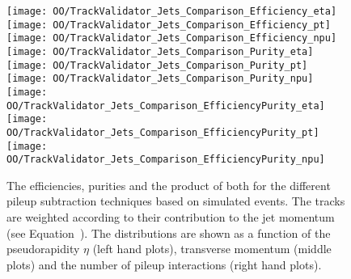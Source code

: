 \begin{figure}[h!t]
  \centering
  \texttt{[image: OO/TrackValidator\_Jets\_Comparison\_Efficiency\_eta]}
  \texttt{[image: OO/TrackValidator\_Jets\_Comparison\_Efficiency\_pt]}
  \texttt{[image: OO/TrackValidator\_Jets\_Comparison\_Efficiency\_npu]}
  \\
  \texttt{[image: OO/TrackValidator\_Jets\_Comparison\_Purity\_eta]}
  \texttt{[image: OO/TrackValidator\_Jets\_Comparison\_Purity\_pt]}
  \texttt{[image: OO/TrackValidator\_Jets\_Comparison\_Purity\_npu]}
  \\
  \texttt{[image: OO/TrackValidator\_Jets\_Comparison\_EfficiencyPurity\_eta]}
  \texttt{[image: OO/TrackValidator\_Jets\_Comparison\_EfficiencyPurity\_pt]}
  \texttt{[image: OO/TrackValidator\_Jets\_Comparison\_EfficiencyPurity\_npu]}
  \caption[Efficiencies, purities and their product for the different pileup subtraction techniques based on simulated \ttbar events with jet weight]{The efficiencies, purities and the product of both for the different pileup subtraction techniques based on simulated \ttbar events. The tracks are weighted according to their contribution to the jet momentum (see Equation~). The distributions are shown as a function of the pseudorapidity $\eta$ (left hand plots), transverse momentum (middle plots) and the number of pileup interactions (right hand plots). \label{plot:OOJetsTVCompTTSignal}}
\end{figure}

